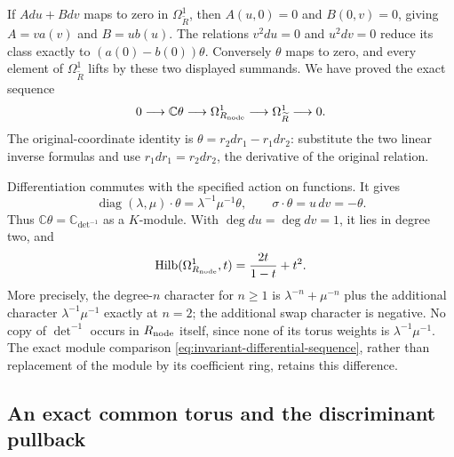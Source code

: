 If $Adu+Bdv$ maps to zero in $\Omega^1_{\widetilde R}$, then
$A(u,0)=0$ and $B(0,v)=0$, giving $A=va(v)$ and $B=ub(u)$.
The relations $v^2du=0$ and $u^2dv=0$ reduce its class exactly to
$(a(0)-b(0))\theta$. Conversely $\theta$ maps to zero, and every
element of $\Omega^1_{\widetilde R}$ lifts by these two displayed
summands. We have proved the exact sequence
\begin{equation}\label{eq:invariant-differential-sequence}
 0\longrightarrow\mathbb C\theta\longrightarrow
 \Omega^1_{R_{\rm node}}\longrightarrow\Omega^1_{\widetilde R}
 \longrightarrow0.
\end{equation}
The original-coordinate identity is
$\theta=r_2dr_1-r_1dr_2$: substitute the two linear inverse formulas
and use $r_1dr_1=r_2dr_2$, the derivative of the original relation.

Differentiation commutes with the specified action on functions.
It gives
\[
 \operatorname{diag}(\lambda,\mu)\cdot\theta
 =\lambda^{-1}\mu^{-1}\theta,
 \qquad \sigma\cdot\theta=u\,dv=-\theta.
\]
Thus $\mathbb C\theta=\mathbb C_{\det^{-1}}$ as a $K$-module.
With $\deg du=\deg dv=1$, it lies in degree two, and
\[
 \operatorname{Hilb}(\Omega^1_{R_{\rm node}},t)
 =\frac{2t}{1-t}+t^2.
\]
More precisely, the degree-$n$ character for $n\ge1$ is
$\lambda^{-n}+\mu^{-n}$ plus the additional character
$\lambda^{-1}\mu^{-1}$ exactly at $n=2$; the additional swap
character is negative. No copy of $\det^{-1}$ occurs in
$R_{\rm node}$ itself, since none of its torus weights is
$\lambda^{-1}\mu^{-1}$. The exact module comparison
\eqref{eq:invariant-differential-sequence}, rather than replacement
of the module by its coefficient ring, retains this difference.

\subsection{An exact common torus and the discriminant pullback}

